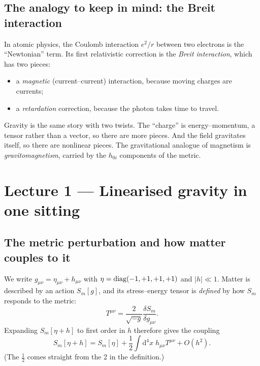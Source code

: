 \documentclass[11pt]{article}
\newcommand{\dd}{\mathrm{d}}
\begin{document}
\subsection{The analogy to keep in mind: the Breit interaction}
In atomic physics, the Coulomb interaction $e^2/r$ between two electrons is the ``Newtonian'' term. Its first relativistic correction is the \emph{Breit interaction}, which has two pieces:
\begin{itemize}[nosep]
\item a \emph{magnetic} (current--current) interaction, because moving charges are currents;
\item a \emph{retardation} correction, because the photon takes time to travel.
\end{itemize}
Gravity is the same story with two twists. The ``charge'' is energy--momentum, a tensor rather than a vector, so there are more pieces. And the field gravitates itself, so there are nonlinear pieces. The gravitational analogue of magnetism is \emph{gravitomagnetism}, carried by the $h_{0i}$ components of the metric.

\section{Lecture 1 --- Linearised gravity in one sitting}

\subsection{The metric perturbation and how matter couples to it}
We write $g_{\mu\nu}=\eta_{\mu\nu}+h_{\mu\nu}$ with $\eta={\rm diag}(-1,+1,+1,+1)$ and $|h|\ll1$. Matter is described by an action $S_m[g]$, and its stress--energy tensor is \emph{defined} by how $S_m$ responds to the metric:
\[
T^{\mu\nu}=\frac{2}{\sqrt{-g}}\frac{\delta S_m}{\delta g_{\mu\nu}}.
\]
Expanding $S_m[\eta+h]$ to first order in $h$ therefore gives the coupling
\begin{equation}
S_m[\eta+h]=S_m[\eta]+\frac12\int\dd^4x\;h_{\mu\nu}T^{\mu\nu}+O(h^2).
\label{eq:coupling}
\end{equation}
(The $\tfrac12$ comes straight from the 2 in the definition.)
\end{document}

